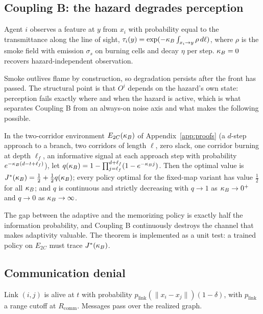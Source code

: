 \subsection{Coupling B: the hazard degrades perception}

\begin{definition}
\label{def:coupB}
Agent $i$ observes a feature at $y$ from $x_i$ with probability equal to the
transmittance along the line of sight, $\tau_i(y) = \exp(-\kappa_B \int_{x_i \to y}
\rho\, d\ell)$, where $\rho$ is the smoke field with emission $\sigma_s$ on
burning cells and decay $\eta$ per step. $\kappa_B = 0$ recovers
hazard-independent observation.
\end{definition}

Smoke outlives flame by construction, so degradation persists after the front
has passed. The structural point is that $O^i$ depends on the hazard's own
state: perception fails exactly where and when the hazard is active, which is
what separates Coupling B from an always-on noise axis and what makes the
following possible.

\begin{theorem}
\label{thm:e2c}
In the two-corridor environment $E_{2C}(\kappa_B)$ of Appendix~\ref{app:proofs}
(a $d$-step approach to a branch, two corridors of length $\ell$, zero slack,
one corridor burning at depth $\ell_f$, an informative signal at each approach
step with probability $e^{-\kappa_B(d - t + \ell_f)}$), let $q(\kappa_B) = 1 -
\prod_{j=\ell_f}^{d+\ell_f}(1 - e^{-\kappa_B j})$. Then the optimal value is
$J^\ast(\kappa_B) = \tfrac12 + \tfrac12 q(\kappa_B)$; every policy optimal for the
fixed-map variant has value $\tfrac12$ for all $\kappa_B$; and $q$ is continuous
and strictly decreasing with $q \to 1$ as $\kappa_B \to 0^+$ and $q \to 0$ as
$\kappa_B \to \infty$.
\end{theorem}

The gap between the adaptive and the memorizing policy is exactly half the
information probability, and Coupling B continuously destroys the channel
that makes adaptivity valuable. The theorem is implemented as a unit test:
a trained policy on $E_{2C}$ must trace $J^\ast(\kappa_B)$.

\subsection{Communication denial}

\begin{definition}
\label{def:comms}
Link $(i,j)$ is alive at $t$ with probability $p_{\mathrm{link}}(\|x_i -
x_j\|)(1-\delta)$, with $p_{\mathrm{link}}$ a range cutoff at $R_{\mathrm{comm}}$.
Messages pass over the realized graph.
\end{definition}

